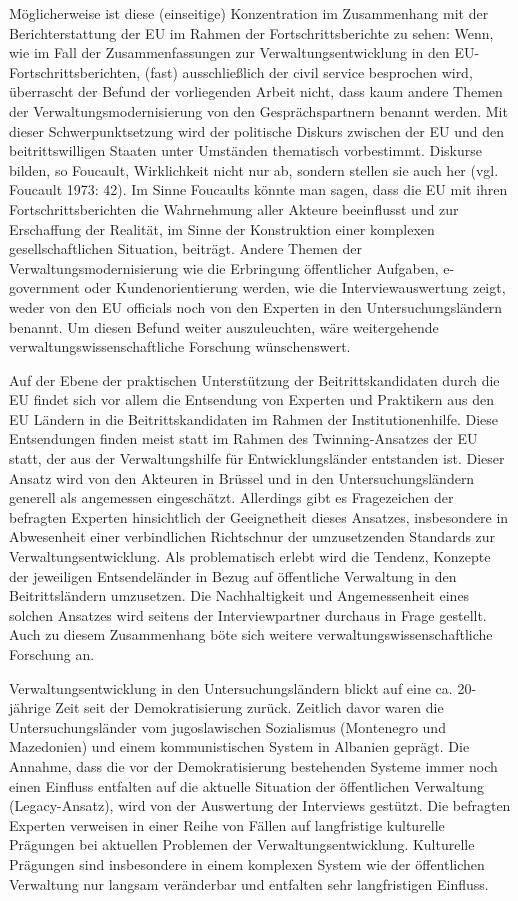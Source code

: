 Möglicherweise ist diese (einseitige) Konzentration im Zusammenhang mit der Berichterstattung der EU im Rahmen der Fortschrittsberichte zu sehen: Wenn, wie im Fall der Zusammenfassungen zur Verwaltungsentwicklung in den EU-Fortschrittsberichten, (fast) ausschließlich der civil service besprochen wird, überrascht der Befund der vorliegenden Arbeit nicht, dass kaum andere Themen der Verwaltungsmodernisierung von den Gesprächspartnern benannt werden. Mit dieser Schwerpunktsetzung wird der politische Diskurs zwischen der EU und den beitrittswilligen Staaten unter Umständen thematisch vorbestimmt. Diskurse bilden, so Foucault, Wirklichkeit nicht nur ab, sondern stellen sie auch her (vgl. Foucault 1973: 42). Im Sinne Foucaults könnte man sagen, dass die EU mit ihren Fortschrittsberichten die Wahrnehmung aller Akteure beeinflusst und zur Erschaffung der Realität, im Sinne der Konstruktion einer komplexen gesellschaftlichen Situation, beiträgt. Andere Themen der Verwaltungsmodernisierung wie die Erbringung öffentlicher Aufgaben, e-government oder Kundenorientierung werden, wie die Interviewauswertung zeigt, weder von den EU officials noch von den Experten in den Untersuchungsländern benannt. Um diesen Befund weiter auszuleuchten, wäre weitergehende verwaltungswissenschaftliche Forschung wünschenswert. \par
Auf der Ebene der praktischen Unterstützung der Beitrittskandidaten durch die EU findet sich vor allem die Entsendung von Experten und Praktikern aus den EU Ländern in die Beitrittskandidaten im Rahmen der Institutionenhilfe. Diese Entsendungen finden meist statt im Rahmen des Twinning-Ansatzes der EU statt, der aus der Verwaltungshilfe für Entwicklungsländer entstanden ist. Dieser Ansatz wird von den Akteuren in Brüssel und in den Untersuchungsländern generell als angemessen eingeschätzt. Allerdings gibt es Fragezeichen der befragten Experten hinsichtlich der Geeignetheit dieses Ansatzes, insbesondere in Abwesenheit einer verbindlichen Richtschnur der umzusetzenden Standards zur Verwaltungsentwicklung. Als problematisch erlebt wird die Tendenz, Konzepte der jeweiligen Entsendeländer in Bezug auf öffentliche Verwaltung in den Beitrittsländern umzusetzen. Die Nachhaltigkeit und Angemessenheit eines solchen Ansatzes wird seitens der Interviewpartner durchaus in Frage gestellt. Auch zu diesem Zusammenhang böte sich weitere verwaltungswissenschaftliche Forschung an. \par
Verwaltungsentwicklung in den Untersuchungsländern blickt auf eine ca. 20-jährige Zeit seit der Demokratisierung zurück. Zeitlich davor waren die Untersuchungsländer vom jugoslawischen Sozialismus (Montenegro und Mazedonien) und einem kommunistischen System in Albanien geprägt. Die Annahme, dass die vor der Demokratisierung bestehenden Systeme immer noch einen Einfluss entfalten auf die aktuelle Situation der öffentlichen Verwaltung (Legacy-Ansatz), wird von der Auswertung der Interviews gestützt. Die befragten Experten verweisen in einer Reihe von Fällen auf langfristige kulturelle Prägungen bei aktuellen Problemen der Verwaltungsentwicklung. Kulturelle Prägungen sind insbesondere in einem komplexen System wie der öffentlichen Verwaltung nur langsam veränderbar und entfalten sehr langfristigen Einfluss.\par
